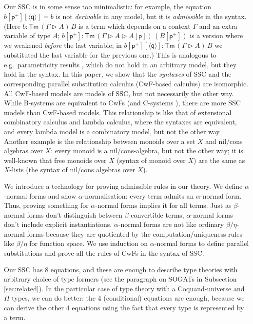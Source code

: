 \documentclass[a4paper,UKenglish]{article}
\newcommand{\Tm}{\mathsf{Tm}}
\newcommand{\p}{\mathsf{p}}
\newcommand{\q}{\mathsf{q}}
\newcommand{\ext}{\mathop{\triangleright}}
\begin{document}
Our SSC is in some sense too minimalistic: for example, the equation
$b[\p^+][\langle\q\rangle] = b$ is not \emph{derivable} in any model,
but it is \emph{admissible} in the syntax. (Here $b : \Tm\,(\Gamma\ext
A)\,B$ is a term which depends on a context $\Gamma$ and an extra
variable of type $A$; $b[\p^+] : \Tm\,(\Gamma\ext A\ext
A[\p])\,(B[\p^+])$ is a version where we weakened \emph{before} the
last variable; in $b[\p^+][\langle\q\rangle] : \Tm\,(\Gamma\ext A)\,B$
we substituted the last variable for the previous one.)  This is
analogous to e.g.\ parametricity results
\cite{DBLP:journals/jfp/BernardyJP12}, which do not hold in an
arbitrary model, but they hold in the syntax. In this paper, we show
that the \emph{syntaxes} of SSC and the corresponding parallel
substitution calculus (CwF-based calculus) are isomorphic. All
CwF-based models are models of SSC, but not
necessarily the other way. While B-systems are equivalent to CwFs (and
C-systems \cite{AHRENS_EMMENEGGER_NORTH_RIJKE_2023}), there are more
SSC models than CwF-based models. This relationship is like that
of extensional combinatory calculus and lambda calculus, where the
syntaxes are equivalent, and every lambda model is a combinatory
model, but not the other way
\cite{DBLP:conf/fscd/AltenkirchKSV23}. Another example is the
relationship between monoids over a set $X$ and nil/cons algebras over
$X$: every monoid is a nil/cons-algebra, but not the other way;
it is well-known that free monoids over $X$ (syntax of monoid over
$X$) are the same as $X$-lists (the syntax of nil/cons algebras
over $X$).

We introduce a technology for proving admissible rules in our
theory. We define $\alpha$-normal forms and show
$\alpha$-normalisation: every term admits an $\alpha$-normal form.
Thus, proving something for $\alpha$-normal forms implies it for all terms.
Just as $\beta$-normal forms
don't distinguish between $\beta$-convertible terms, $\alpha$-normal
forms don't include explicit instantiations. $\alpha$-normal forms are
not like ordinary $\beta/\eta$-normal forms because they are 
quotiented by the computation/uniqueness rules like $\beta$/$\eta$ for
function space. We use induction on $\alpha$-normal forms to define
parallel substitutions and prove all the rules of CwFs in the syntax
of SSC.

Our SSC has 8 equations, and these are enough to describe type
theories with arbitrary choice of type formers (see the paragraph on
SOGATs in Subsection \ref{sec:related}). In the particular case of
type theory with a Coquand-universe and $\Pi$ types, we can do better:
the 4 (conditional) equations are enough, because we can derive the
other 4 equations using the fact that every type is represented by a
term.
\end{document}
